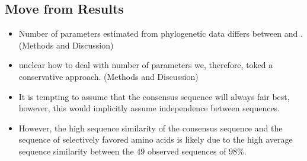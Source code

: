 \documentclass[12pt]{article}
\begin{document}
\begin{itemize}
\section*{Move from Results}
\begin{itemize}
\item Number of parameters estimated from phylogenetic data differs between \selac and \phydms. (Methods and Discussion)
\item unclear how to deal with number of parameters we, therefore, toked a conservative approach. (Methods and Discussion)
  \item It is tempting to assume that the consensus sequence will always fair best, however, this would implicitly assume independence between sequences.
\item However, the high sequence similarity of the consensus sequence and the sequence of selectively favored amino acids is likely due to the high average sequence similarity between the 49 observed sequences of $98 \%$.
  \end{itemize}

\end{itemize}
\end{document}
